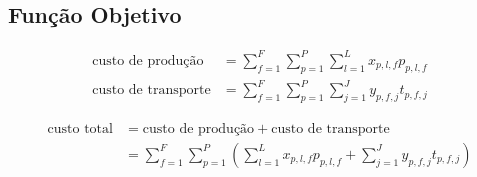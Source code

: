     \subsection{Função Objetivo}

        \begin{align*}
            \text{custo de produção} &= \sum_{f = 1}^F \sum_{p = 1}^P \sum_{l = 1}^L  x_{p,l,f} p_{p,l,f} \\
            \text{custo de transporte} &= \sum_{f = 1}^F \sum_{p = 1}^P \sum_{j = 1}^J y_{p,f,j} t_{p,f,j}
        \end{align*}

        \begin{align*}
            \text{custo total} &= \text{custo de produção} + \text{custo de transporte} \\
            &= \sum_{f = 1}^F \sum_{p = 1}^P \left(\sum_{l = 1}^L  x_{p,l,f} p_{p,l,f} + \sum_{j = 1}^J y_{p,f,j} t_{p,f,j}\right)
        \end{align*}
